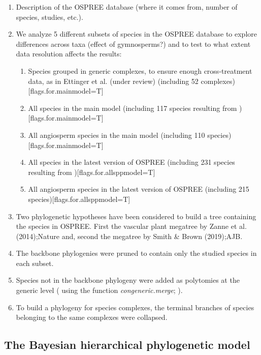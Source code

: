 \documentclass{article}\usepackage[]{graphicx}\usepackage[]{color}
\begin{document}
\begin{enumerate}
\item Description of the OSPREE database (where it comes from, number of species, studies, etc.).  

\item We analyze 5 different subsets of species in the OSPREE database to explore differences across taxa (effect of gymnosperms?) and to test to what extent data resolution affects the results:

\begin{enumerate}
\item Species grouped in generic complexes, to ensure enough cross-treatment data, as in Ettinger et al. (under review) (including 52 complexes)[flags.for.mainmodel=T]
\item All species in the main model (including 117 species resulting from )[flags.for.mainmodel=T]
\item All angiosperm species in the main model (including 110 species)[flags.for.mainmodel=T]
\item All species in the latest version of OSPREE (including 231 species resulting from )[flags.for.allsppmodel=T]
\item All angiosperm species in the latest version of OSPREE (including 215 species)[flags.for.allsppmodel=T]
\end{enumerate}

\item Two phylogenetic hypotheses have been considered to build a tree containing the species in OSPREE. First the vascular plant megatree by Zanne et al. (2014);Nature and, second the megatree by Smith \& Brown (2019);AJB. 

\item The backbone phylogenies were pruned to contain only the studied species in each subset.  

\item Species not in the backbone phylogeny were added as polytomies at the generic level ( using the function \emph{congeneric.merge}; \citep{pearse2015pez}).  

\item To build a phylogeny for species complexes, the terminal branches of species belonging to the same complexes were collapsed.  

\end{enumerate}




\subsection*{The Bayesian hierarchical phylogenetic model}
\end{document}
